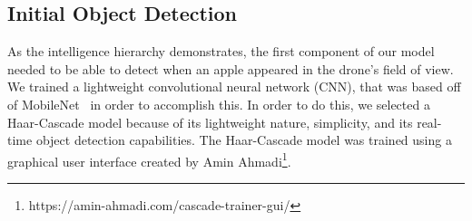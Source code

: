 \subsection{Initial Object Detection}
As the intelligence hierarchy demonstrates, the first component of our model needed to be able to detect when an apple appeared in the drone's field of view. 
We trained a lightweight convolutional neural network (CNN), that was based off of MobileNet~\cite{Sandler2018,PyTorchMobileNet} in order to accomplish this. 
In order to do this, we selected a Haar-Cascade model because of its lightweight nature, simplicity, and its real-time object detection capabilities. The Haar-Cascade model was trained using a graphical user interface created by Amin Ahmadi\footnote{https://amin-ahmadi.com/cascade-trainer-gui/}.